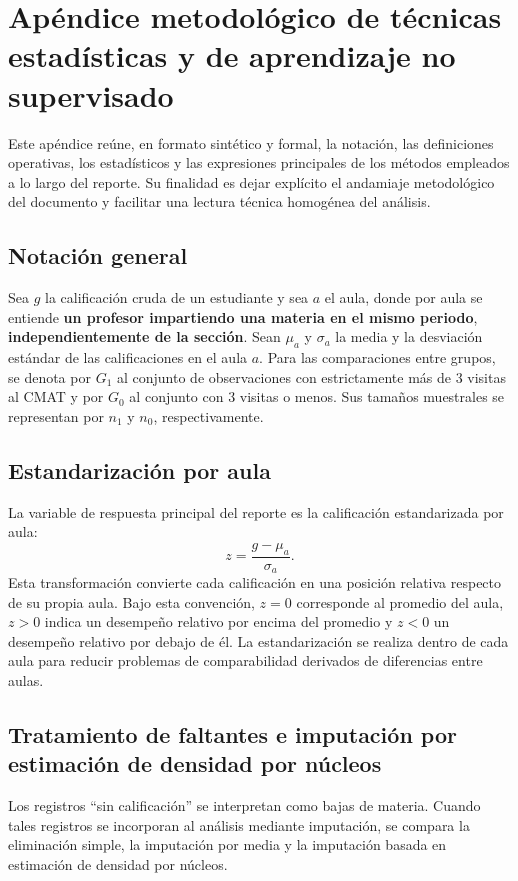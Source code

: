 \documentclass[10pt,letterpaper]{article} %
\numberwithin{figure}{subsection}
\let\oldsection\section
\renewcommand{\section}{\clearpage\oldsection}
\begin{document}
\appendix
\newpage
\section{Apéndice metodológico de técnicas estadísticas y de aprendizaje no supervisado}

Este apéndice reúne, en formato sintético y formal, la notación, las definiciones operativas, los estadísticos y las expresiones principales de los métodos empleados a lo largo del reporte. Su finalidad es dejar explícito el andamiaje metodológico del documento y facilitar una lectura técnica homogénea del análisis.

\subsection{Notación general}
\label{apx:notation}
Sea $g$ la calificación cruda de un estudiante y sea $a$ el aula, donde por aula se entiende \textbf{un profesor impartiendo una materia en el mismo periodo}, \textbf{independientemente de la sección}. Sean $\mu_a$ y $\sigma_a$ la media y la desviación estándar de las calificaciones en el aula $a$. Para las comparaciones entre grupos, se denota por $G_1$ al conjunto de observaciones con estrictamente más de 3 visitas al CMAT y por $G_0$ al conjunto con 3 visitas o menos. Sus tamaños muestrales se representan por $n_1$ y $n_0$, respectivamente.

\subsection{Estandarización por aula}
\label{apx:z-score}
La variable de respuesta principal del reporte es la calificación estandarizada por aula:
\[
z=\frac{g-\mu_a}{\sigma_a}.
\]
Esta transformación convierte cada calificación en una posición relativa respecto de su propia aula. Bajo esta convención, $z=0$ corresponde al promedio del aula, $z>0$ indica un desempeño relativo por encima del promedio y $z<0$ un desempeño relativo por debajo de él. La estandarización se realiza dentro de cada aula para reducir problemas de comparabilidad derivados de diferencias entre aulas.

\subsection{Tratamiento de faltantes e imputación por estimación de densidad por núcleos}
\label{apx:kde-imputation}
Los registros ``sin calificación'' se interpretan como bajas de materia. Cuando tales registros se incorporan al análisis mediante imputación, se compara la eliminación simple, la imputación por media y la imputación basada en estimación de densidad por núcleos.
\end{document}
